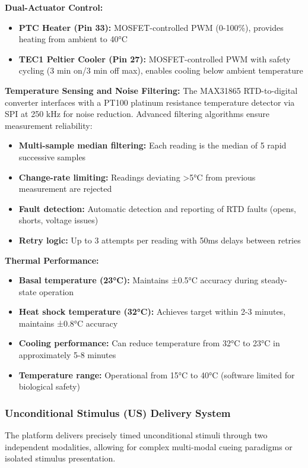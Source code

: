 \documentclass[11pt,a4paper]{article}
\begin{document}
\textbf{Dual-Actuator Control:}
\begin{itemize}
\item \textbf{PTC Heater (Pin 33):} MOSFET-controlled PWM (0-100\%), provides heating from ambient to 40°C
\item \textbf{TEC1 Peltier Cooler (Pin 27):} MOSFET-controlled PWM with safety cycling (3 min on/3 min off max), enables cooling below ambient temperature
\end{itemize}

\textbf{Temperature Sensing and Noise Filtering:}
The MAX31865 RTD-to-digital converter interfaces with a PT100 platinum resistance temperature detector via SPI at 250 kHz for noise reduction. Advanced filtering algorithms ensure measurement reliability:

\begin{itemize}
\item \textbf{Multi-sample median filtering:} Each reading is the median of 5 rapid successive samples
\item \textbf{Change-rate limiting:} Readings deviating >5°C from previous measurement are rejected
\item \textbf{Fault detection:} Automatic detection and reporting of RTD faults (opens, shorts, voltage issues)
\item \textbf{Retry logic:} Up to 3 attempts per reading with 50ms delays between retries
\end{itemize}

\textbf{Thermal Performance:}
\begin{itemize}
\item \textbf{Basal temperature (23°C):} Maintains ±0.5°C accuracy during steady-state operation
\item \textbf{Heat shock temperature (32°C):} Achieves target within 2-3 minutes, maintains ±0.8°C accuracy
\item \textbf{Cooling performance:} Can reduce temperature from 32°C to 23°C in approximately 5-8 minutes
\item \textbf{Temperature range:} Operational from 15°C to 40°C (software limited for biological safety)
\end{itemize}

\subsubsection{Unconditional Stimulus (US) Delivery System}

The platform delivers precisely timed unconditional stimuli through two independent modalities, allowing for complex multi-modal cueing paradigms or isolated stimulus presentation.
\end{document}
